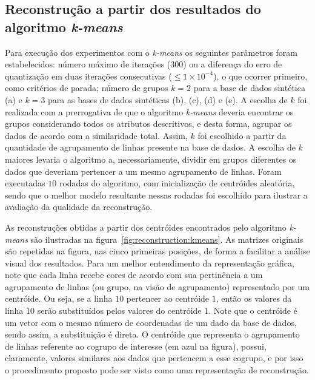 \documentclass[
    12pt,                %
    oneside,            %
    a4paper,            %
    english,            %
    brazil                %
    ]{abntex2ppgsi}
\begin{document}
\subsection{Reconstrução a partir dos resultados do algoritmo \textit{k-means}}
\label{subsec:results-reconstruction-kmeans}


Para execução dos experimentos com o \textit{k-means} os seguintes parâmetros foram estabelecidos: número máximo de iterações ($300$) ou a diferença do erro de quantização em duas iterações consecutivas ($\leq 1 \times 10^{-4}$), o que ocorrer primeiro, como critérios de parada; número de grupos $k = 2$ para a base de dados sintética (a) e $k = 3$ para as bases de dados sintéticas (b), (c), (d) e (e).
A escolha de $k$ foi realizada com a prerrogativa de que o algoritmo \textit{k-means} deveria encontrar os grupos considerando todos os atributos descritivos, e desta forma, agrupar os dados de acordo com a similaridade total. Assim, $k$ foi escolhido a partir da quantidade de agrupamento de linhas presente na base de dados.
A escolha de $k$ maiores levaria o algoritmo a, necessariamente, dividir em grupos diferentes os dados que deveriam pertencer a um mesmo agrupamento de linhas.
Foram executadas $10$ rodadas do algoritmo, com inicialização de centróides aleatória, sendo que o melhor modelo resultante nessas rodadas foi escolhido para ilustrar a avaliação da qualidade da reconstrução.

As reconstruções obtidas a partir dos centróides encontrados pelo algoritmo \textit{k-means} são ilustradas na figura~\ref{fig:reconstruction:kmeans}.
As matrizes originais são repetidas na figura, nas cinco primeiras posições, de forma a facilitar a análise visual dos resultados.
Para um melhor entendimento da representação gráfica, note que cada linha recebe cores de acordo com sua pertinência a um agrupamento de linhas (ou grupo, na visão de agrupamento) representado por um centróide.
Ou seja, se a linha $10$ pertencer ao centróide $1$, então os valores da linha $10$ serão substituídos pelos valores do centróide $1$.
Note que o centróide é um vetor com o mesmo número de coordenadas de um dado da base de dados, sendo assim, a substituição é direta.
O centróide que representa o agrupamento de linhas referente ao cogrupo de interesse (em azul na figura), possui, claramente, valores similares aos dados que pertencem a esse cogrupo, e por isso o procedimento proposto pode ser visto como uma representação de reconstrução.
\end{document}
